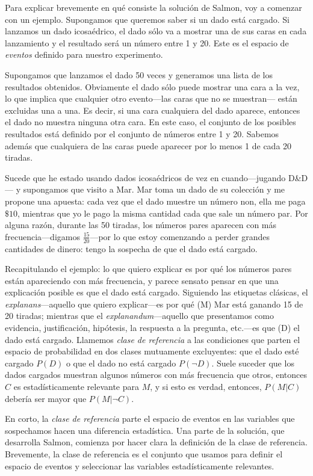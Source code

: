 Para explicar brevemente en qué consiste la solución de
Salmon, voy a comenzar con un ejemplo. Supongamos que
queremos saber si un dado está cargado. Si lanzamos un dado
icosaédrico, el dado sólo va a mostrar una de sus caras en
cada lanzamiento y el resultado será un número entre 1 y 20.
Este es el espacio de \emph{eventos} definido para nuestro
experimento.

Supongamos que lanzamos el dado 50 veces y generamos una
lista de los resultados obtenidos. Obviamente el dado sólo
puede mostrar una cara a la vez, lo que implica que
cualquier otro evento---las caras que no se muestran---
están excluidas una a una. Es decir, si una cara cualquiera
del dado aparece, entonces el dado no muestra ninguna otra
cara. En este caso, el conjunto de los posibles resultados
está definido por el conjunto de números entre 1 y 20.
Sabemos además que cualquiera de las caras puede aparecer
por lo menos 1 de cada 20 tiradas.

Sucede que he estado usando dados icosaédricos de vez en
cuando---jugando D\&D--- y supongamos que visito a Mar. Mar
toma un dado de su colección y me propone una apuesta: cada
vez que el dado muestre un número non, ella me paga $ \$10
$, mientras que yo le pago la misma cantidad cada que sale
un número par. Por alguna razón, durante las 50 tiradas, los
números pares aparecen con más frecuencia---digamos $
\frac{15}{20} $---por lo que estoy comenzando a perder
grandes cantidades de dinero: tengo la sospecha de que el
dado está cargado.

Recapitulando el ejemplo: lo que quiero explicar es por qué
los números pares están apareciendo con más frecuencia, y
parece sensato pensar en que una explicación posible es que
el dado está cargado. Siguiendo las etiquetas clásicas, el
\emph{explanans}---aquello que quiero explicar---es por qué
(M) Mar está ganando 15 de 20 tiradas; mientras que el 
\emph{explanandum}---aquello que presentamos como evidencia,
justificación, hipótesis, la respuesta a la pregunta, 
etc.---es que (D) el dado está cargado. Llamemos \emph{clase
de referencia} a las condiciones que parten el espacio de
probabilidad en dos clases mutuamente excluyentes: que el
dado esté cargado $P(D) $ o que el dado no está cargado 
$P(\neg D)$. Suele suceder que los dados cargados muestran
algunos números con más frecuencia que otros, entonces $ C $
es estadísticamente relevante para $ M $, y si esto es
verdad, entonces, $ P( M | C ) $ debería ser mayor que $ P(M 
| \neg C ) $.

En corto, la \emph{clase de referencia} parte el espacio de
eventos en las variables que sospechamos hacen una
diferencia estadística. Una parte de la solución, que
desarrolla Salmon, comienza por hacer clara la definición de
la clase de referencia. Brevemente, la clase de referencia
es el conjunto que usamos para definir el espacio de eventos
y seleccionar las variables estadísticamente relevantes.

